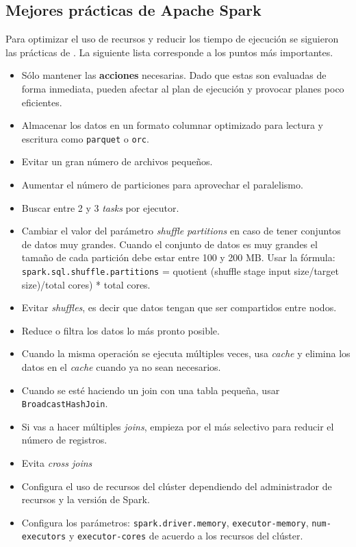\subsection{Mejores prácticas de Apache Spark}

Para optimizar el uso de recursos y reducir los tiempo de ejecución se siguieron las prácticas de \cite{sparkibm}. La siguiente lista corresponde a los puntos más importantes.

\begin{itemize}
	\item Sólo mantener las \textbf{acciones} necesarias. Dado que estas son evaluadas de forma inmediata, pueden afectar al plan de ejecución y provocar planes poco eficientes.
	\item Almacenar los datos en un formato columnar optimizado para lectura y escritura como \texttt{parquet} o \texttt{orc}.
	\item Evitar un gran número de archivos pequeños.
	\item Aumentar el número de particiones para aprovechar el paralelismo.
	\item Buscar entre 2 y 3 \textit{tasks} por ejecutor.
	\item Cambiar el valor del parámetro \textit{shuffle partitions} en caso de tener conjuntos de datos muy grandes. Cuando el conjunto de datos es muy grandes el tamaño de cada partición debe estar entre 100 y 200 MB. Usar la fórmula: \texttt{spark.sql.shuffle.partitions} = quotient (shuffle stage input size/target size)/total cores) * total cores.
	\item Evitar \textit{shuffles}, es decir que datos tengan que ser compartidos entre nodos.
	\item Reduce o filtra los datos lo más pronto posible.
	\item Cuando la misma operación se ejecuta múltiples veces, usa \textit{cache} y elimina los datos en el \textit{cache} cuando ya no sean necesarios.
	\item Cuando se esté haciendo un join con una tabla pequeña, usar \texttt{BroadcastHashJoin}.
	\item Si vas a hacer múltiples \textit{joins}, empieza por el más selectivo para reducir el número de registros.
	\item Evita \textit{cross joins}
	\item Configura el uso de recursos del clúster dependiendo del administrador de recursos y la versión de Spark.
	\item Configura los parámetros: \texttt{spark.driver.memory}, \texttt{executor-memory}, \texttt{num-executors} y \texttt{executor-cores} de acuerdo a los recursos del clúster.

\end{itemize}
